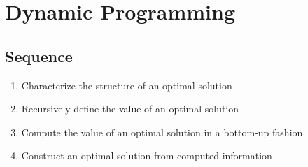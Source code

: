 \chapter{Dynamic Programming}
\newpage

\section{Sequence}
\begin{enumerate}
	\item Characterize the structure of an optimal solution
	\item Recursively define the value of an optimal solution
	\item Compute the value of an optimal solution in a bottom-up fashion
	\item Construct an optimal solution from computed information
\end{enumerate}


\newpage


\newpage


\newpage


\newpage